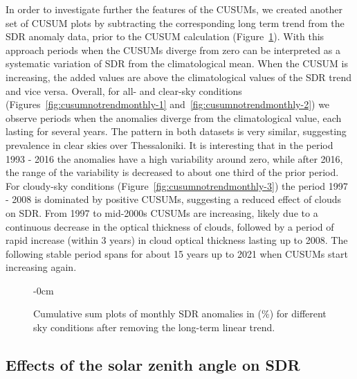 \documentclass[applsci,article,submit,moreauthors,pdftex]{Definitions/mdpi}
\begin{document}
In order to investigate further the features of the CUSUMs, we created
another set of CUSUM plots by subtracting the corresponding long term
trend from the SDR anomaly data, prior to the CUSUM calculation
(Figure~\ref{fig:cusumnotrendmonthly}). With this approach periods when
the CUSUMs diverge from zero can be interpreted as a systematic
variation of SDR from the climatological mean. When the CUSUM is
increasing, the added values are above the climatological values of the
SDR trend and vice versa. Overall, for all- and clear-sky conditions
(Figures~\ref{fig:cusumnotrendmonthly-1}
and~\ref{fig:cusumnotrendmonthly-2}) we observe periods when the
anomalies diverge from the climatological value, each lasting for
several years. The pattern in both datasets is very similar, suggesting
prevalence in clear skies over Thessaloniki. It is interesting that in
the period 1993 - 2016 the anomalies have a high variability around
zero, while after 2016, the range of the variability is decreased to
about one third of the prior period. For cloudy-sky conditions
(Figure~\ref{fig:cusumnotrendmonthly-3}) the period 1997 - 2008 is
dominated by positive CUSUMs, suggesting a reduced effect of clouds on
SDR. From 1997 to mid-2000s CUSUMs are increasing, likely due to a
continuous decrease in the optical thickness of clouds, followed by a
period of rapid increase (within 3 years) in cloud optical thickness
lasting up to 2008. The following stable period spans for about 15 years
up to 2021 when CUSUMs start increasing again.

\begin{figure}[h!]
    \begin{adjustwidth}{-\extralength}{0cm}
        {\centering 
            \hfill
            \hfill
        }
        \caption{Cumulative sum plots of monthly SDR anomalies in (\%) for different sky conditions after removing the long-term linear trend.}\label{fig:cusumnotrendmonthly}
\end{adjustwidth}
\end{figure}

\hypertarget{effects-of-the-solar-zenith-angle-on-sdr}{%
\subsection{Effects of the solar zenith angle on
SDR}\label{effects-of-the-solar-zenith-angle-on-sdr}}
\end{document}
